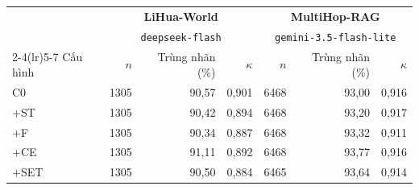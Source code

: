 \begin{tabular}{lrrrrrr}\toprule
 & \multicolumn{3}{c}{\textbf{LiHua-World}} & \multicolumn{3}{c}{\textbf{MultiHop-RAG}}\\
 & \multicolumn{3}{c}{\texttt{deepseek-flash}} & \multicolumn{3}{c}{\texttt{gemini-3.5-flash-lite}}\\
\cmidrule(lr){2-4}\cmidrule(lr){5-7}
Cấu hình & $n$ & Trùng nhãn (\%) & $\kappa$ & $n$ & Trùng nhãn (\%) & $\kappa$\\\midrule
C0 & 1305 & 90,57 & 0,901 & 6468 & 93,00 & 0,916\\
+ST & 1305 & 90,42 & 0,894 & 6468 & 93,20 & 0,917\\
+F & 1305 & 90,34 & 0,887 & 6468 & 93,32 & 0,911\\
+CE & 1305 & 91,11 & 0,892 & 6468 & 93,77 & 0,916\\
+SET & 1305 & 90,50 & 0,884 & 6465 & 93,64 & 0,914\\
\bottomrule\end{tabular}
